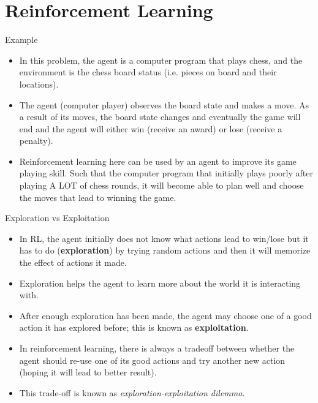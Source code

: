 \documentclass[10pt,mathserif]{beamer}
\begin{document}
\section{Reinforcement Learning}

\begin{frame}{Example}
\begin{itemize}
\item In this problem, the agent is a computer program that plays chess, and the environment is the chess board status (i.e. pieces on board and their locations).
\item The agent (computer player) observes the board state and makes a move. As a result of its moves, the board state changes and eventually the game will end and the agent will either win (receive an award) or lose (receive a penalty).
\item Reinforcement learning here can be used by an agent to improve its game playing skill. Such that the computer program that initially plays poorly after playing A LOT of chess rounds, it will become able to plan well and choose the moves that lead to winning the game.
\end{itemize}
\end{frame}

\begin{frame}{Exploration vs Exploitation}
\begin{itemize}
\item In RL, the agent initially does not know what actions lead to win/lose but it has to do (\textbf{exploration}) by trying random actions and then it will memorize the effect of actions it made.
\item Exploration helps the agent to learn more about the world it is interacting with.
\item After enough exploration has been made, the agent may choose one of a good action it has explored before; this is known as \textbf{exploitation}.
\item In reinforcement learning, there is always a tradeoff between whether the agent should re-use one of its good actions and try another new action (hoping it will lead to better result).
\item This trade-off is known as \textit{exploration-exploitation dilemma.}
\end{itemize}
\end{frame}
\end{document}
